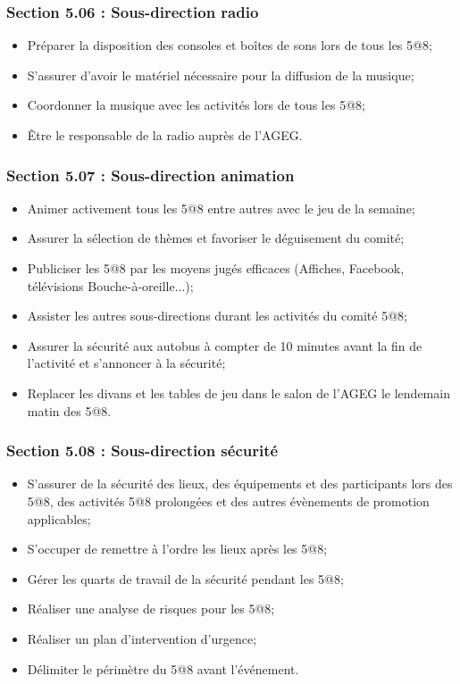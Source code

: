 \subsubsection*{Section 5.06 : Sous-direction radio}
\begin{itemize}
\item Préparer la disposition des consoles et boîtes de sons lors de tous les 5@8;
\item S’assurer d’avoir le matériel nécessaire pour la diffusion de la musique;
\item Coordonner la musique avec les activités lors de tous les 5@8;
\item Être le responsable de la radio auprès de l’AGEG.
\end{itemize}

\subsubsection*{Section 5.07 : Sous-direction animation}
\begin{itemize}
\item Animer activement tous les 5@8 entre autres avec le jeu de la semaine;
\item Assurer la sélection de thèmes et favoriser le déguisement du comité;
\item Publiciser les 5@8 par les moyens jugés efficaces (Affiches, Facebook, télévisions Bouche-à-oreille...);
\item Assister les autres sous-directions durant les activités du comité 5@8;
\item Assurer la sécurité aux autobus à compter de 10 minutes avant la fin de l’activité et s’annoncer à la sécurité;
\item Replacer les divans et les tables de jeu dans le salon de l’AGEG le lendemain matin des 5@8.
\end{itemize}

\subsubsection*{Section 5.08 : Sous-direction sécurité}
\begin{itemize}
\item S’assurer de la sécurité des lieux, des équipements et des participants lors des 5@8, des activités 5@8 prolongées et des autres évènements de promotion applicables;
\item S’occuper de remettre à l’ordre les lieux après les 5@8;
\item Gérer les quarts de travail de la sécurité pendant les 5@8;
\item Réaliser une analyse de risques pour les 5@8;
\item Réaliser un plan d’intervention d’urgence;
\item Délimiter le périmètre du 5@8 avant l’événement.
\end{itemize}

